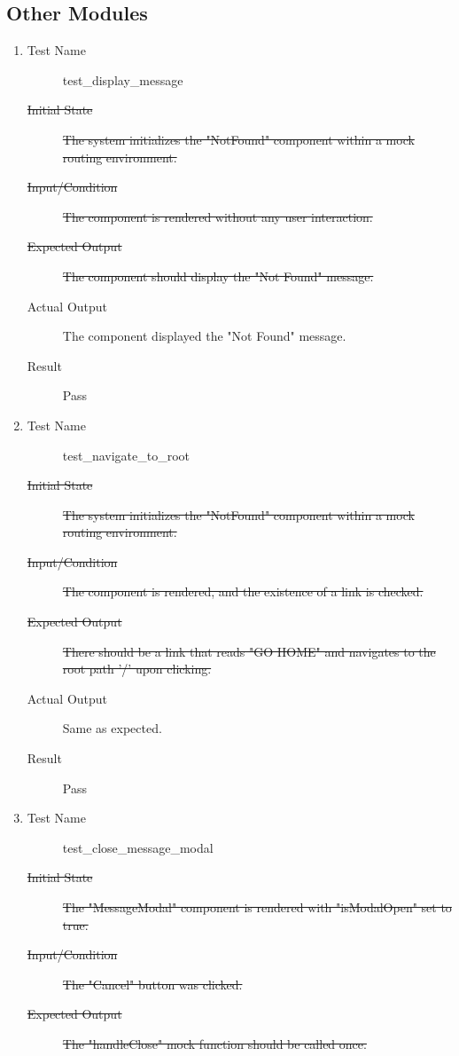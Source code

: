 \documentclass[12pt, titlepage]{article}
\begin{document}
\subsection{Other Modules}
\begin{enumerate}[UT-OT1]
\item \label{UT-OT1}
  \begin{description}
  \item[Test Name] test\_display\_message
  \item[\sout{Initial State}]\sout{ The system initializes the "NotFound" component within a
    mock routing environment.
  }
		\item[\sout{Input/Condition}]\sout{ The component is rendered without any user interaction.
  }
		\item[\sout{Expected Output}]\sout{ The component should display the "Not Found" message.
  }
		\item[Actual Output] The component displayed the "Not Found" message.
  \item[Result] Pass
  \end{description}
\item \label{UT-OT2}
  \begin{description}
  \item[Test Name] test\_navigate\_to\_root
  \item[\sout{Initial State}]\sout{ The system initializes the "NotFound" component within a
    mock routing environment.
  }
		\item[\sout{Input/Condition}]\sout{ The component is rendered, and the existence of a link
    is checked.
  }
		\item[\sout{Expected Output}]\sout{ There should be a link that reads "GO HOME" and
    navigates to the root path '/' upon clicking.
  }
		\item[Actual Output] Same as expected.
  \item[Result] Pass
  \end{description}
\item \label{UT-OT3}
  \begin{description}
  \item[Test Name] test\_close\_message\_modal
  \item[\sout{Initial State}]\sout{ The "MessageModal" component is rendered with
    "isModalOpen" set to true.
  }
		\item[\sout{Input/Condition}]\sout{ The "Cancel" button was clicked.
  }
		\item[\sout{Expected Output}]\sout{ The "handleClose" mock function should be called once.
}
\end{description}
\end{enumerate}
\end{document}
